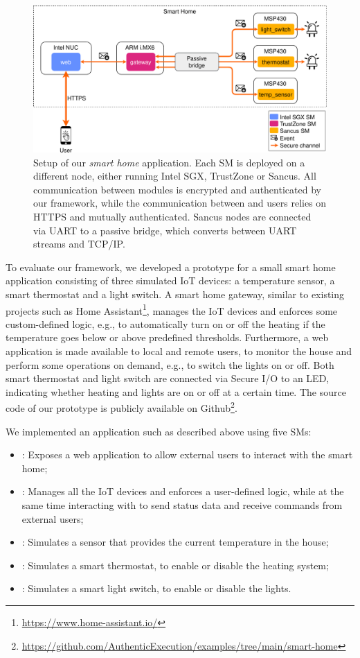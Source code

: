 \begin{figure}[t]
  \hspace*{-0.3cm}
  \includegraphics[width=0.7\columnwidth]{graphics/smart-home.drawio.pdf}

  \caption{Setup of our \emph{smart home} application. Each \ac{SM} is deployed
  on a different node, either running Intel \ac{SGX}, TrustZone or Sancus. All
  communication between modules is encrypted and authenticated by our framework,
  while the communication between \web{} and users relies on HTTPS and mutually
  authenticated. Sancus nodes are connected via UART to a passive bridge, which
  converts between UART streams and TCP/IP.}
  \label{fig:eval-setup}
\end{figure}

To evaluate our framework, we developed a prototype for a small smart home
application consisting of three simulated IoT devices: a temperature sensor, a
smart thermostat and a light switch. A smart home gateway, similar to existing
projects such as Home Assistant\footnote{\url{https://www.home-assistant.io/}},
manages the IoT devices and enforces some custom-defined logic, e.g., to
automatically turn on or off the heating if the temperature goes below or above
predefined thresholds. Furthermore, a web application is made available to local
and remote users, to monitor the house and perform some operations on demand,
e.g., to switch the lights on or off. Both smart thermostat and light switch are
connected via Secure I/O to an LED, indicating whether heating and lights are on
or off at a certain time. The source code of our prototype is publicly available
on
Github\footnote{\url{https://github.com/AuthenticExecution/examples/tree/main/smart-home}}.

We implemented an application such as described above using five \acp{SM}:
\begin{itemize}
  \item \web: Exposes a web application to allow external users to interact with
  the smart home;
  \item \gateway: Manages all the IoT devices and enforces a user-defined logic,
  while at the same time interacting with \web{} to send status data and receive
  commands from external users;
  \item \tempsensor: Simulates a sensor that provides the current temperature in
  the house;
  \item \thermostat: Simulates a smart thermostat, to enable or disable the
  heating system;
  \item \light: Simulates a smart light switch, to enable or disable the lights.
\end{itemize}

